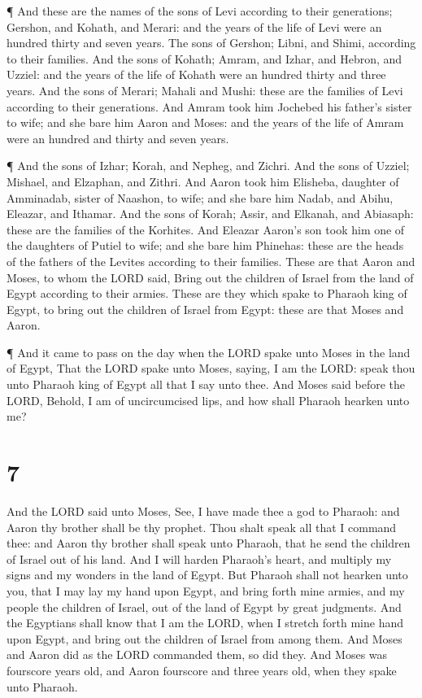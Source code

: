  ¶ And these are the names of the sons of Levi according to
their generations; Gershon, and Kohath, and Merari: and the years of the
life of Levi were an hundred thirty and seven years.  The
sons of Gershon; Libni, and Shimi, according to their families.
 And the sons of Kohath; Amram, and Izhar, and Hebron, and
Uzziel: and the years of the life of Kohath were an hundred thirty and
three years.  And the sons of Merari; Mahali and Mushi:
these are the families of Levi according to their generations.
 And Amram took him Jochebed his father's sister to wife;
and she bare him Aaron and Moses: and the years of the life of Amram
were an hundred and thirty and seven years.

 ¶ And the sons of Izhar; Korah, and Nepheg, and Zichri.
 And the sons of Uzziel; Mishael, and Elzaphan, and Zithri.
 And Aaron took him Elisheba, daughter of Amminadab, sister
of Naashon, to wife; and she bare him Nadab, and Abihu, Eleazar, and
Ithamar.  And the sons of Korah; Assir, and Elkanah, and
Abiasaph: these are the families of the Korhites.  And
Eleazar Aaron's son took him one of the daughters of Putiel to wife; and
she bare him Phinehas: these are the heads of the fathers of the Levites
according to their families.  These are that Aaron and
Moses, to whom the LORD said, Bring out the children of Israel from the
land of Egypt according to their armies.  These are they
which spake to Pharaoh king of Egypt, to bring out the children of
Israel from Egypt: these are that Moses and Aaron.

 ¶ And it came to pass on the day when the LORD spake unto
Moses in the land of Egypt,  That the LORD spake unto
Moses, saying, I am the LORD: speak thou unto Pharaoh king of Egypt all
that I say unto thee.  And Moses said before the LORD,
Behold, I am of uncircumcised lips, and how shall Pharaoh hearken unto
me?

\hypertarget{section-6}{%
\section{7}\label{section-6}}

 And the LORD said unto Moses, See, I have made thee a god
to Pharaoh: and Aaron thy brother shall be thy prophet. 
Thou shalt speak all that I command thee: and Aaron thy brother shall
speak unto Pharaoh, that he send the children of Israel out of his land.
 And I will harden Pharaoh's heart, and multiply my signs
and my wonders in the land of Egypt.  But Pharaoh shall not
hearken unto you, that I may lay my hand upon Egypt, and bring forth
mine armies, and my people the children of Israel, out of the land of
Egypt by great judgments.  And the Egyptians shall know that
I am the LORD, when I stretch forth mine hand upon Egypt, and bring out
the children of Israel from among them.  And Moses and Aaron
did as the LORD commanded them, so did they.  And Moses was
fourscore years old, and Aaron fourscore and three years old, when they
spake unto Pharaoh.

